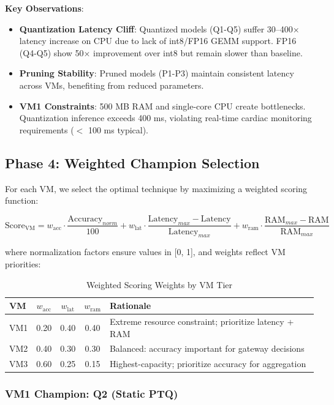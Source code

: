 \documentclass[12pt, a4paper]{article}
\begin{document}
\textbf{Key Observations}:

\begin{itemize}
    \item \textbf{Quantization Latency Cliff}: Quantized models (Q1-Q5) suffer 30–400× latency increase on CPU due to lack of int8/FP16 GEMM support. FP16 (Q4-Q5) show 50× improvement over int8 but remain slower than baseline.
    \item \textbf{Pruning Stability}: Pruned models (P1-P3) maintain consistent latency across VMs, benefiting from reduced parameters.
    \item \textbf{VM1 Constraints}: 500 MB RAM and single-core CPU create bottlenecks. Quantization inference exceeds 400 ms, violating real-time cardiac monitoring requirements ($<$ 100 ms typical).
\end{itemize}

\subsection{Phase 4: Weighted Champion Selection}

For each VM, we select the optimal technique by maximizing a weighted scoring function:

$$\text{Score}_{\text{VM}} = w_{\text{acc}} \cdot \frac{\text{Accuracy}_{norm}}{100} + w_{\text{lat}} \cdot \frac{\text{Latency}_{max} - \text{Latency}}{\text{Latency}_{max}} + w_{\text{ram}} \cdot \frac{\text{RAM}_{max} - \text{RAM}}{\text{RAM}_{max}}$$

where normalization factors ensure values in [0, 1], and weights reflect VM priorities:

\begin{table}[H]
\centering
\caption{Weighted Scoring Weights by VM Tier}
\begin{tabular}{lccc}
\toprule
\textbf{VM} & $w_{\text{acc}}$ & $w_{\text{lat}}$ & $w_{\text{ram}}$ & \textbf{Rationale} \\
\midrule
VM1 & 0.20 & 0.40 & 0.40 & Extreme resource constraint; prioritize latency + RAM \\
VM2 & 0.40 & 0.30 & 0.30 & Balanced: accuracy important for gateway decisions \\
VM3 & 0.60 & 0.25 & 0.15 & Highest-capacity; prioritize accuracy for aggregation \\
\bottomrule
\end{tabular}
\label{tab:weighting}
\end{table}

\subsubsection{VM1 Champion: Q2 (Static PTQ)}
\end{document}
